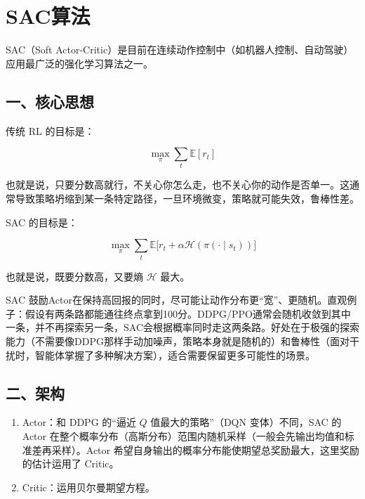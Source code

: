 \setcounter{section}{5}

\hypertarget{sacux7b97ux6cd5}{%
\section{SAC算法}\label{sacux7b97ux6cd5}}

SAC（Soft Actor-Critic）是目前在连续动作控制中（如机器人控制、自动驾驶）应用最广泛的强化学习算法之一。

\hypertarget{ux4e00ux6838ux5fc3ux601dux60f3-4}{%
\subsection{一、核心思想}\label{ux4e00ux6838ux5fc3ux601dux60f3-4}}

传统 RL 的目标是：

\[
\max_\pi
\sum_t
\mathbb{E}[r_t]
\]

也就是说，只要分数高就行，不关心你怎么走，也不关心你的动作是否单一。这通常导致策略坍缩到某一条特定路径，一旦环境微变，策略就可能失效，鲁棒性差。

SAC 的目标是：

\[
\max_\pi
\sum_t
\mathbb{E}
\bigl[
r_t+\alpha\mathcal{H}(\pi(\cdot\mid s_t))
\bigr]
\]

也就是说，既要分数高，又要熵 \(\mathcal{H}\) 最大。

SAC 鼓励Actor在保持高回报的同时，尽可能让动作分布更``宽''、更随机。直观例子：假设有两条路都能通往终点拿到100分。DDPG/PPO通常会随机收敛到其中一条，并不再探索另一条，SAC会根据概率同时走这两条路。好处在于极强的探索能力（不需要像DDPG那样手动加噪声，策略本身就是随机的）和鲁棒性（面对干扰时，智能体掌握了多种解决方案），适合需要保留更多可能性的场景。

\hypertarget{ux4e8cux67b6ux6784}{%
\subsection{二、架构}\label{ux4e8cux67b6ux6784}}

\begin{enumerate}
\def\labelenumi{\arabic{enumi}.}
\item
  Actor：和 DDPG 的``逼近 \(Q\) 值最大的策略''（DQN 变体）不同，SAC 的 Actor 在整个概率分布（高斯分布）范围内随机采样（一般会先输出均值和标准差再采样）。Actor 希望自身输出的概率分布能使期望总奖励最大，这里奖励的估计运用了 Critic。
\item
  Critic：运用贝尔曼期望方程。
\end{enumerate}

